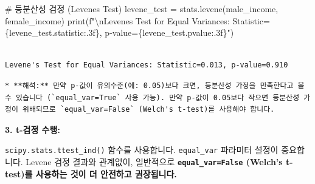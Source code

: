 \documentclass[
  letterpaper,
]{book}
\newenvironment{Shaded}{\begin{snugshade}}{\end{snugshade}}
\newcommand{\BuiltInTok}[1]{\textcolor[rgb]{0.00,0.23,0.31}{#1}}
\newcommand{\CharTok}[1]{\textcolor[rgb]{0.13,0.47,0.30}{#1}}
\newcommand{\CommentTok}[1]{\textcolor[rgb]{0.37,0.37,0.37}{#1}}
\newcommand{\NormalTok}[1]{\textcolor[rgb]{0.00,0.23,0.31}{#1}}
\newcommand{\OperatorTok}[1]{\textcolor[rgb]{0.37,0.37,0.37}{#1}}
\newcommand{\SpecialCharTok}[1]{\textcolor[rgb]{0.37,0.37,0.37}{#1}}
\newcommand{\SpecialStringTok}[1]{\textcolor[rgb]{0.13,0.47,0.30}{#1}}
\begin{document}
\begin{Shaded}
\begin{Highlighting}[]
    \CommentTok{\# 등분산성 검정 (Levene\textquotesingle{}s Test)}
\NormalTok{    levene\_test }\OperatorTok{=}\NormalTok{ stats.levene(male\_income, female\_income)}
    \BuiltInTok{print}\NormalTok{(}\SpecialStringTok{f"}\CharTok{\textbackslash{}n}\SpecialStringTok{Levene\textquotesingle{}s Test for Equal Variances: Statistic=}\SpecialCharTok{\{}\NormalTok{levene\_test}\SpecialCharTok{.}\NormalTok{statistic}\SpecialCharTok{:.3f\}}\SpecialStringTok{, p{-}value=}\SpecialCharTok{\{}\NormalTok{levene\_test}\SpecialCharTok{.}\NormalTok{pvalue}\SpecialCharTok{:.3f\}}\SpecialStringTok{"}\NormalTok{)}
\end{Highlighting}
\end{Shaded}

\begin{verbatim}

Levene's Test for Equal Variances: Statistic=0.013, p-value=0.910
\end{verbatim}

\begin{verbatim}
* **해석:** 만약 p-값이 유의수준(예: 0.05)보다 크면, 등분산성 가정을 만족한다고 볼 수 있습니다 (`equal_var=True` 사용 가능). 만약 p-값이 0.05보다 작으면 등분산성 가정이 위배되므로 `equal_var=False` (Welch's t-test)를 사용해야 합니다.
\end{verbatim}

\textbf{3. t-검정 수행:}

\texttt{scipy.stats.ttest\_ind()} 함수를 사용합니다. \texttt{equal\_var}
파라미터 설정이 중요합니다. Levene 검정 결과와 관계없이, 일반적으로
\textbf{\texttt{equal\_var=False} (Welch's t-test)를 사용하는 것이 더
안전하고 권장됩니다.}
\end{document}
